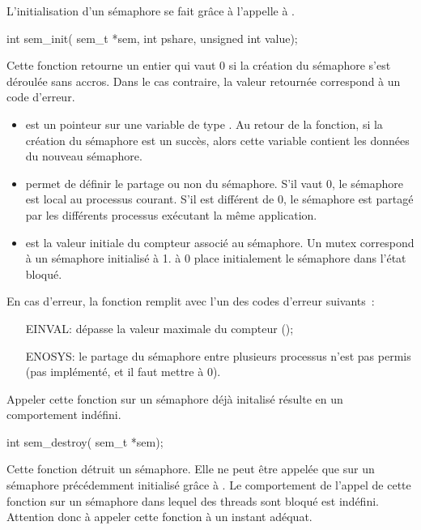 \label{func:sem_init}
L'initialisation d'un sémaphore se fait grâce à l'appelle à .
\begin{codeblock}
int sem_init(
    sem_t *sem,
    int pshare,
    unsigned int value);
\end{codeblock}

Cette fonction retourne un entier qui vaut 0 si la création du sémaphore s'est déroulée sans accros. Dans le cas contraire, la valeur retournée correspond à un code d'erreur.

\begin{itemize}
\item{} est un pointeur sur une variable de type . Au retour de la fonction, si la création du sémaphore est un succès, alors cette variable contient les données du nouveau sémaphore.

\item{} permet de définir le partage ou non du sémaphore. S'il vaut 0, le sémaphore est local au processus courant. S'il est différent de 0, le sémaphore est partagé par les différents processus exécutant la même application.

\item{} est la valeur initiale du compteur associé au sémaphore. Un mutex correspond à un sémaphore initialisé à 1.  à 0 place initialement le sémaphore dans l'état bloqué.
\end{itemize}
En cas d'erreur, la fonction remplit  avec l'un des codes d'erreur suivants~:
\begin{itemize}
\item[EINVAL:]  dépasse la valeur maximale du compteur ();
\item[ENOSYS:] le partage du sémaphore entre plusieurs processus n'est pas permis (pas implémenté, et il faut mettre  à 0).
\end{itemize}
Appeler cette fonction sur un sémaphore déjà initalisé résulte en un comportement indéfini.



\label{func:sem_destroy}

\begin{codeblock}
int sem_destroy(
    sem_t *sem);
\end{codeblock}

Cette fonction détruit un sémaphore. Elle ne peut être appelée que sur un sémaphore précédemment initialisé grâce à . Le comportement de l'appel de cette fonction sur un sémaphore dans lequel des threads sont bloqué est indéfini. Attention donc à appeler cette fonction à un instant adéquat.

